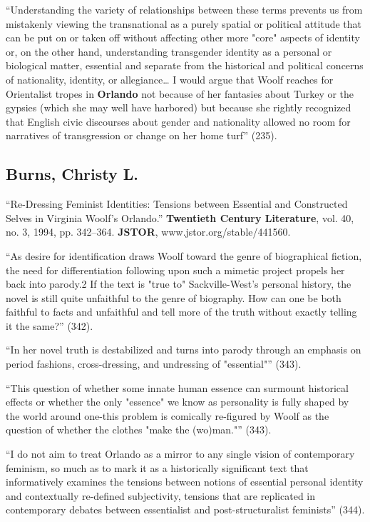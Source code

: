 \documentclass[11pt]{article}
\begin{document}
“Understanding the variety of relationships between these terms
prevents us from mistakenly viewing the transnational as a purely
spatial or political attitude that can be put on or taken off without
affecting other more "core" aspects of identity or, on the other hand,
understanding transgender identity as a personal or biological matter,
essential and separate from the historical and political concerns of
nationality, identity, or allegiance… I would argue that Woolf reaches
for Orientalist tropes in \textbf{Orlando} not because of her fantasies about
Turkey or the gypsies (which she may well have harbored) but because
she rightly recognized that English civic discourses about gender and
nationality allowed no room for narratives of transgression or change
on her home turf” (235).

\subsection{Burns, Christy L.}
\label{sec:orgd0b6290}
“Re-Dressing Feminist Identities: Tensions between Essential and
Constructed Selves in Virginia Woolf's Orlando.” \textbf{Twentieth Century
Literature}, vol. 40, no. 3, 1994, pp. 342–364. \textbf{JSTOR},
www.jstor.org/stable/441560.

“As desire for identification draws Woolf toward the genre of
biographical fiction, the need for differentiation following upon such
a mimetic project propels her back into parody.2 If the text is "true
to" Sackville-West's personal history, the novel is still quite
unfaithful to the genre of biography. How can one be both faithful to
facts and unfaithful and tell more of the truth without exactly
telling it the same?” (342).

“In her novel truth is destabilized and turns into parody through an
emphasis on period fashions, cross-dressing, and undressing of
"essential"” (343).

“This question of whether some innate human essence can surmount
historical effects or whether the only "essence" we know as
personality is fully shaped by the world around one-this problem is
comically re-figured by Woolf as the question of whether the clothes
"make the (wo)man."” (343).

“I do not aim to treat Orlando as a mirror to any single vision of
contemporary feminism, so much as to mark it as a historically
significant text that informatively examines the tensions between
notions of essential personal identity and contextually re-defined
subjectivity, tensions that are replicated in contemporary debates
between essentialist and post-structuralist feminists” (344).
\end{document}
